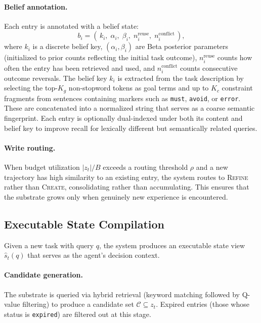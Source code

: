 \paragraph{Belief annotation.}
Each entry is annotated with a belief state:
\begin{equation}
\label{eq:belief-state}
  b_i = (\, k_i,\; \alpha_i,\; \beta_i,\; n_i^{\mathrm{reuse}},\; n_i^{\mathrm{conflict}} \,),
\end{equation}
where $k_i$ is a discrete belief key, $(\alpha_i, \beta_i)$ are Beta posterior parameters (initialized to prior counts reflecting the initial task outcome), $n_i^{\mathrm{reuse}}$ counts how often the entry has been retrieved and used, and $n_i^{\mathrm{conflict}}$ counts consecutive outcome reversals. The belief key $k_i$ is extracted from the task description by selecting the top-$K_g$ non-stopword tokens as goal terms and up to $K_c$ constraint fragments from sentences containing markers such as \texttt{must}, \texttt{avoid}, or \texttt{error}. These are concatenated into a normalized string that serves as a coarse semantic fingerprint. Each entry is optionally dual-indexed under both its content and belief key to improve recall for lexically different but semantically related queries.

\paragraph{Write routing.}
When budget utilization $|z_t|/B$ exceeds a routing threshold $\rho$ and a new trajectory has high similarity to an existing entry, the system routes to \textsc{Refine} rather than \textsc{Create}, consolidating rather than accumulating. This ensures that the substrate grows only when genuinely new experience is encountered.


\subsection{Executable State Compilation}
\label{sec:retrieve}

Given a new task with query $q$, the system produces an executable state view $\hat{s}_t(q)$ that serves as the agent's decision context.

\paragraph{Candidate generation.}
The substrate is queried via hybrid retrieval (keyword matching followed by Q-value filtering) to produce a candidate set $\mathcal{C} \subseteq z_t$. Expired entries (those whose status is \texttt{expired}) are filtered out at this stage.

